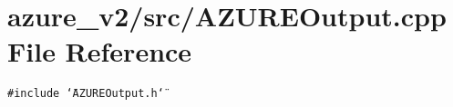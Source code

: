 \section{azure\_\-v2/src/AZUREOutput.cpp File Reference}
\label{AZUREOutput_8cpp}
{\tt \#include \char`\"{}AZUREOutput.h\char`\"{}}\par
